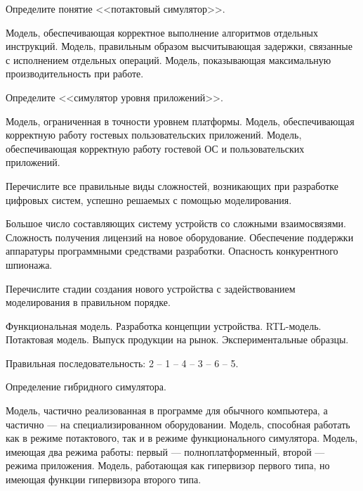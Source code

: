 \begin{questions}

\question[3] Определите понятие <<потактовый симулятор>>.
\begin{choices}
\choice Модель, обеспечивающая корректное выполнение алгоритмов отдельных инструкций.
\correctchoice Модель, правильным образом высчитывающая задержки, связанные с исполнением отдельных операций.
\choice Модель, показывающая максимальную производительность при работе.
\end{choices}

\question[3] Определите <<симулятор уровня приложений>>.
\begin{choices}
\choice Модель, ограниченная в точности уровнем платформы.
\correctchoice Модель, обеспечивающая корректную работу гостевых пользовательских приложений.
\choice Модель, обеспечивающая корректную работу гостевой ОС и пользовательских приложений.
\end{choices}

\question[3] Перечислите все правильные виды сложностей, возникающих при разработке цифровых систем, успешно решаемых с помощью моделирования.
\begin{choices}
\correctchoice Большое число составляющих систему устройств со сложными взаимосвязями.
\choice Сложность получения лицензий на новое оборудование.
\correctchoice Обеспечение поддержки аппаратуры программными средствами разработки.
\choice Опасность конкурентного шпионажа.
\end{choices}

\question[3] Перечислите стадии создания нового устройства с задействованием моделирования в правильном порядке.
\begin{choices}
\choice Функциональная модель.
\choice Разработка концепции устройства.
\choice RTL-модель.
\choice Потактовая модель.
\choice Выпуск продукции на рынок.
\choice Экспериментальные образцы.
\end{choices}
\begin{solution}
    Правильная последовательность: 2 -- 1 -- 4 -- 3 -- 6 -- 5.
\end{solution}

\question[3] Определение гибридного симулятора.
\begin{choices}
\correctchoice Модель, частично реализованная в программе для обычного компьютера, а частично --- на специализированном оборудовании.
\choice Модель, способная работать как в режиме потактового, так и в режиме функционального симулятора.
\choice Модель, имеющая два режима работы: первый --- полноплатформенный, второй --- режима приложения.
\choice Модель, работающая как гипервизор первого типа, но имеющая функции гипервизора второго типа.
\end{choices}


\end{questions}
